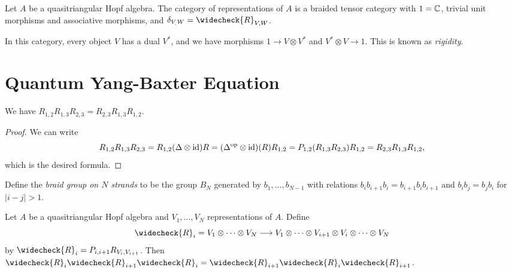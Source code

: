 \begin{theorem}
  Let $A$ be a quasitriangular Hopf algebra.
  The category of representations of
  $A$ is a braided tensor category with
  $1 = \mathbb{C}$, trivial unit morphisms and
  associative morphisms, and
  $\delta_{V_, W} = \widecheck{R}_{V, W}$.
\end{theorem}

\begin{remark}
  In this category, every object
  $V$ has a dual $V^*$, and we have morphisms
  $1 \to V \otimes V^*$ and
  $V^* \otimes V \to 1$. This is known as
  \emph{rigidity}.
\end{remark}

\section{Quantum Yang-Baxter Equation}

\begin{prop}
  We have $R_{1, 2} R_{1, 3} R_{2, 3} = R_{2, 3} R_{1, 3} R_{1, 2}$.
\end{prop}

\begin{proof}
  We can write
  \[
    R_{1, 2} R_{1, 3} R_{2, 3}
    = R_{1, 2} (\Delta \otimes {\operatorname{id}}) R
    = (\Delta^{\mathrm{op}} \otimes {\operatorname{id}})(R)R_{1, 2}
    = P_{1, 2}(R_{1, 3} R_{2, 3}) R_{1, 2}
    = R_{2, 3} R_{1, 3} R_{1, 2},
  \]
  which is the desired formula.
\end{proof}

\begin{definition}
  Define the \emph{braid group on $N$ strands}
  to be the group $B_N$
  generated by $b_1, \dots, b_{N - 1}$
  with relations
  $b_i b_{i + 1} b_i = b_{i + 1} b_i b_{i + 1}$
  and $b_i b_j = b_j b_i$ for $|i - j| > 1$.
\end{definition}

\begin{theorem}
  Let $A$ be a quasitriangular Hopf algebra
  and $V_1, \dots, V_N$ representations
  of $A$. Define
  \[
    \widecheck{R}_i
    = V_1 \otimes \cdots \otimes V_N
    \longrightarrow
    V_1 \otimes \cdots \otimes V_{i + 1}
    \otimes V_i \otimes \cdots \otimes V_N
  \]
  by $\widecheck{R}_i = P_{i, i + 1} R_{V_i, V_{i + 1}}$.
  Then $\widecheck{R}_i \widecheck{R}_{i + 1} \widecheck{R}_i = \widecheck{R}_{i + 1} \widecheck{R}_i \widecheck{R}_{i + 1}$.
\end{theorem}

